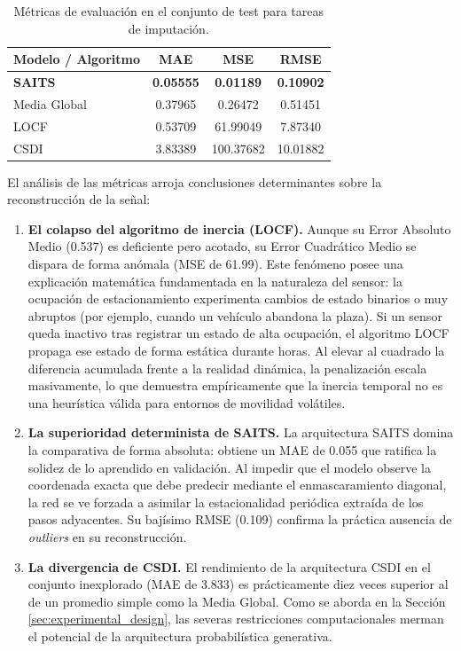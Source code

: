 \begin{table}[H]
	\centering
	\caption{Métricas de evaluación en el conjunto de test para tareas de imputación.}
	\label{tab:resultados_imputacion}
	\begin{tabular}{lccc}
		\toprule
		\textbf{Modelo / Algoritmo} & \textbf{MAE} & \textbf{MSE} & \textbf{RMSE} \\
		\midrule
		\textbf{SAITS} & \textbf{0.05555} & \textbf{0.01189} & \textbf{0.10902} \\
		Media Global & 0.37965 & 0.26472 & 0.51451 \\
		LOCF & 0.53709 & 61.99049 & 7.87340 \\
		CSDI & 3.83389 & 100.37682 & 10.01882 \\
		\bottomrule
	\end{tabular}
\end{table}

El análisis de las métricas arroja conclusiones determinantes sobre la reconstrucción de la señal:

\begin{enumerate}
	\item \textbf{El colapso del algoritmo de inercia (LOCF).}
	Aunque su Error Absoluto Medio (0.537) es deficiente pero acotado, su Error Cuadrático Medio se dispara de forma anómala (MSE de 61.99). Este fenómeno posee una explicación matemática fundamentada en la naturaleza del sensor: la ocupación de estacionamiento experimenta cambios de estado binarios o muy abruptos (por ejemplo, cuando un vehículo abandona la plaza). Si un sensor queda inactivo tras registrar un estado de alta ocupación, el algoritmo LOCF propaga ese estado de forma estática durante horas. Al elevar al cuadrado la diferencia acumulada frente a la realidad dinámica, la penalización escala masivamente, lo que demuestra empíricamente que la inercia temporal no es una heurística válida para entornos de movilidad volátiles.
	
	\item \textbf{La superioridad determinista de SAITS.}
	La arquitectura SAITS domina la comparativa de forma absoluta: obtiene un MAE de 0.055 que ratifica la solidez de lo aprendido en validación. Al impedir que el modelo observe la coordenada exacta que debe predecir mediante el enmascaramiento diagonal, la red se ve forzada a asimilar la estacionalidad periódica extraída de los pasos adyacentes. Su bajísimo RMSE (0.109) confirma la práctica ausencia de \textit{outliers} en su reconstrucción.
	
	\item \textbf{La divergencia de CSDI.}
	El rendimiento de la arquitectura CSDI en el conjunto inexplorado (MAE de 3.833) es prácticamente diez veces superior al de un promedio simple como la Media Global. Como se aborda en la Sección \ref{sec:experimental_design}, las severas restricciones computacionales merman el potencial de la arquitectura probabilística generativa.
\end{enumerate}






